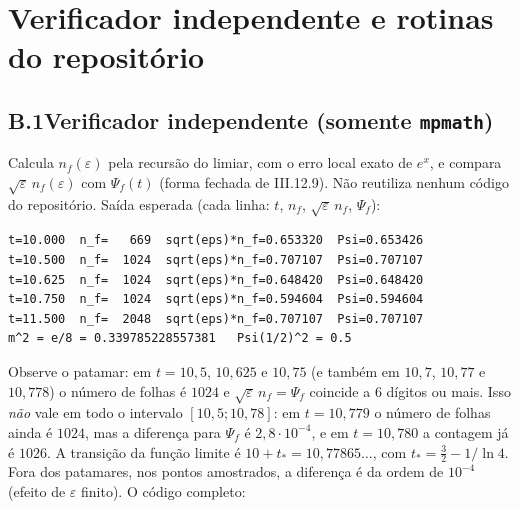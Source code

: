 \documentclass[11pt,a4paper]{article}
\begin{document}
\clearpage
\section{Verificador independente e rotinas do repositório}
\subsection*{B.1\quad Verificador independente (somente \texttt{mpmath})}
Calcula $n_f(\varepsilon)$ pela recursão do limiar, com o erro local exato de $e^x$, e compara $\sqrt\varepsilon\,n_f(\varepsilon)$ com $\Psi_f(t)$ (forma fechada de III.12.9). Não reutiliza nenhum código do repositório. Saída esperada (cada linha: $t$, $n_f$, $\sqrt\varepsilon\,n_f$, $\Psi_f$):
{\footnotesize\begin{verbatim}
t=10.000  n_f=   669  sqrt(eps)*n_f=0.653320  Psi=0.653426
t=10.500  n_f=  1024  sqrt(eps)*n_f=0.707107  Psi=0.707107
t=10.625  n_f=  1024  sqrt(eps)*n_f=0.648420  Psi=0.648420
t=10.750  n_f=  1024  sqrt(eps)*n_f=0.594604  Psi=0.594604
t=11.500  n_f=  2048  sqrt(eps)*n_f=0.707107  Psi=0.707107
m^2 = e/8 = 0.339785228557381   Psi(1/2)^2 = 0.5
\end{verbatim}}
Observe o patamar: em $t=10{,}5$, $10{,}625$ e $10{,}75$ (e também em $10{,}7$, $10{,}77$ e $10{,}778$) o número de folhas é $1024$ e $\sqrt\varepsilon\,n_f=\Psi_f$ coincide a 6 dígitos ou mais. Isso \emph{não} vale em todo o intervalo $[10{,}5;10{,}78]$: em $t=10{,}779$ o número de folhas ainda é $1024$, mas a diferença para $\Psi_f$ é $2{,}8\cdot10^{-4}$, e em $t=10{,}780$ a contagem já é $1026$. A transição da função limite é $10+t_*=10{,}77865\ldots$, com $t_*=\tfrac32-1/\ln4$. Fora dos patamares, nos pontos amostrados, a diferença é da ordem de $10^{-4}$ (efeito de $\varepsilon$ finito). O código completo:
{\footnotesize}
\end{document}
